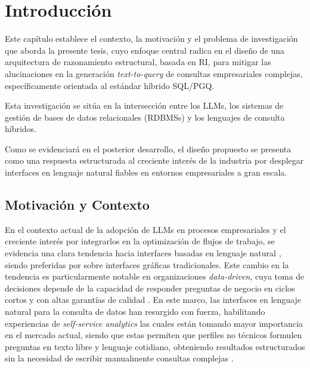 \chapter{Introducción}
\label{chap:introduction}

Este capítulo establece el contexto, la motivación y el problema de investigación que aborda la presente tesis, cuyo enfoque central radica en el diseño de una arquitectura de razonamiento estructural, basada en \ac{RI}, para mitigar las alucinaciones en la generación \emph{text-to-query} de consultas empresariales complejas, específicamente orientada al estándar híbrido \ac{SQL}/\ac{PGQ}.

Esta investigación se sitúa en la intersección entre los \acp{LLM}, los sistemas de gestión de bases de datos relacionales (\acp{RDBMS}) y los lenguajes de consulta híbridos.

Como se evidenciará en el posterior desarrollo, el diseño propuesto se presenta como una respuesta estructurada al creciente interés de la industria por desplegar interfaces en lenguaje natural fiables en entornos empresariales a gran escala.



\section{Motivación y Contexto}
\label{sec:motivacion_contexto}

En el contexto actual de la adopción de \acp{LLM} en procesos empresariales y el creciente interés por integrarlos en la optimización de flujos de trabajo, se evidencia una clara tendencia hacia interfaces basadas en lenguaje natural \cite{Data2Decisions}, siendo preferidas por sobre interfaces gráficas tradicionales. Este cambio en la tendencia es particularmente notable en organizaciones \emph{data-driven}, cuya toma de decisiones depende de la capacidad de responder preguntas de negocio en ciclos cortos y con altas garantías de calidad \cite{llm-insight}. En este marco, las interfaces en lenguaje natural para la consulta de datos han resurgido con fuerza, habilitando experiencias de \emph{self-service analytics} las cuales están tomando mayor importancia en el mercado actual, siendo que estas permiten que perfiles no técnicos formulen preguntas en texto libre y lenguaje cotidiano, obteniendo resultados estructurados sin la necesidad de escribir manualmente consultas complejas \cite{NLinterfaces}. 

